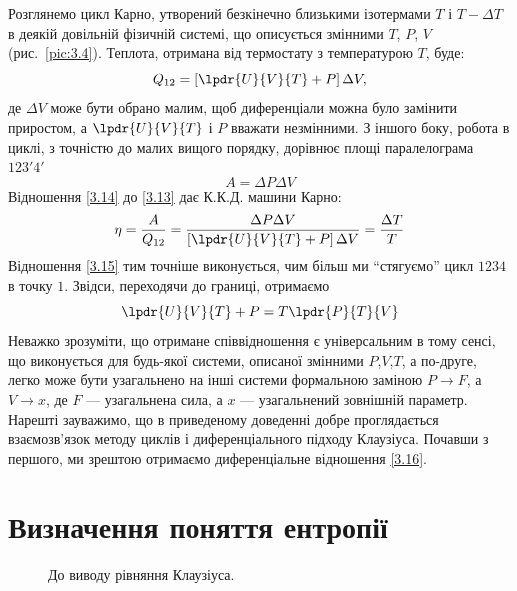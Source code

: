 Розглянемо цикл Карно, утворений безкінечно близькими ізотермами $T$ і $T-\Delta T$ в деякій довільній
фізичній системі, що описується змінними $T$, $P$, $V$ (рис.~\ref{pic:3.4}). Теплота, отримана від
термостату з температурою $T$, буде:
\begin{equation}\label{3.13}
	Q_{12} = \left[\lpdr{U}{V}{T} +P\right]\Delta V,
\end{equation}
де $\Delta V$ може бути обрано малим, щоб диференціали можна було замінити приростом, а
$\lpdr{U}{V}{T}$ і $P$ вважати незмінними. З іншого боку, робота в циклі, з точністю до малих вищого
порядку, дорівнює площі паралелограма $123'4'$
\begin{equation}\label{3.14}
	A =\Delta P \Delta V
\end{equation}
Відношення \eqref{3.14} до \eqref{3.13} дає К.К.Д. машини Карно:
\begin{equation}\label{3.15}
	\eta = \dfrac{A}{Q_{12}} = \dfrac{\Delta P \Delta V}{\left[\lpdr{U}{V}{T} + P\right]\Delta V} = \dfrac{\Delta T}{T}
\end{equation}
Відношення \eqref{3.15} тим точніше виконується, чим більш ми \enquote{стягуємо} цикл $1234$ в точку
$1$.
Звідси, переходячи до границі, отримаємо
\begin{equation}\label{3.16}
	\lpdr{U}{V}{T} + P = T \lpdr{P}{T}{V}
\end{equation}
Неважко зрозуміти, що отримане співвідношення є універсальним в тому сенсі, що виконується для
будь-якої системи, описаної змінними $P$,$V$,$T$, а по-друге, легко може бути узагальнено на інші
системи формальною заміною $P\rightarrow F$, а $V\rightarrow x$, де $F$ --- узагальнена сила, а $x$
--- узагальнений зовнішній параметр. Нарешті зауважимо, що в приведеному доведенні добре проглядається
взаємозв'язок методу циклів і диференціального підходу Клаузіуса. Почавши з першого, ми зрештою
отримаємо диференціальне відношення \eqref{3.16}.

\section{Визначення поняття ентропії}

\begin{figure}[h!]\centering
        
\caption{До виводу рівняння Клаузіуса.}
\label{pic:3.5}
\end{figure}

